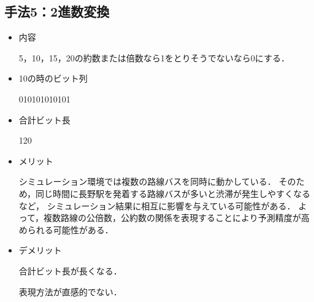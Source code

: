 \documentclass[main]{subfiles}
\begin{document}
        \subsection{手法5：2進数変換}
        \begin{itemize}
            \item 内容
            
                5，10，15，20の約数または倍数なら1をとりそうでないなら0にする．
            \item 10の時のビット列
                
                010101010101
            \item 合計ビット長
            
                120
            \item メリット
            
                シミュレーション環境では複数の路線バスを同時に動かしている．
                そのため，同じ時間に長野駅を発着する路線バスが多いと渋滞が発生しやすくなるなど，
                シミュレーション結果に相互に影響を与えている可能性がある．
                よって，複数路線の公倍数，公約数の関係を表現することにより予測精度が高められる可能性がある．
            \item デメリット
                
                合計ビット長が長くなる．

                表現方法が直感的でない．
            
        \end{itemize}
\end{document}
